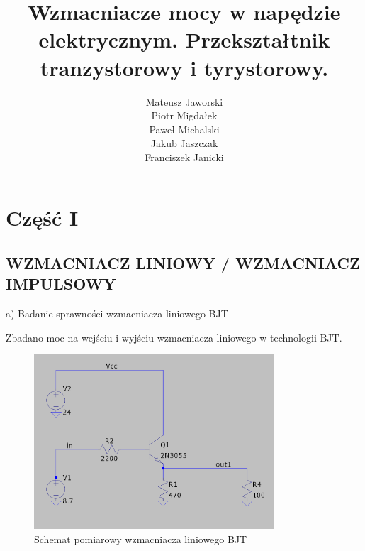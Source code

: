 \documentclass[11pt]{article}
\title{Wzmacniacze mocy w napędzie elektrycznym. Przekształtnik tranzystorowy i tyrystorowy.}
\author{
  Mateusz Jaworski \\
  Piotr Migdałek \\
  Paweł Michalski \\
  Jakub Jaszczak \\
  Franciszek Janicki
}
\begin{document}
\maketitle

\tableofcontents
\newpage

\section{Część I}

\subsection{WZMACNIACZ LINIOWY / WZMACNIACZ IMPULSOWY}

a) Badanie sprawności wzmacniacza liniowego BJT

Zbadano moc na wejściu i wyjściu wzmacniacza liniowego w technologii BJT.\\

\begin{figure}[H]
\centering
\includegraphics[width=0.8\textwidth]{aun1_liniowy_bjt.png}
\caption{Schemat pomiarowy wzmacniacza liniowego BJT}
\end{figure}
\end{document}
